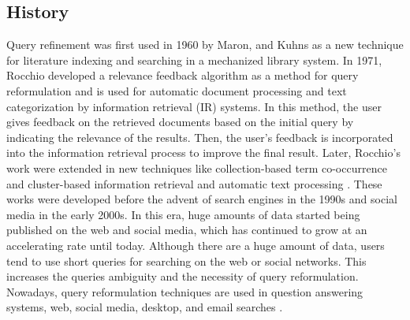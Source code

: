 \documentclass[sigconf]{acmart}
\begin{document}
\subsection{History}
Query refinement was first used in 1960 by Maron, and Kuhns \cite{maron1960relevance} as a new technique for literature indexing and searching in a mechanized library system. In 1971, Rocchio \cite{rocchio1971relevance} developed a relevance feedback algorithm as a method for query reformulation and is used for automatic document processing and text categorization by information retrieval (IR) systems. In this method, the user gives feedback on the retrieved documents based on the initial query by indicating the relevance of the results. Then, the user’s feedback is incorporated into the information retrieval process to improve the final result. Later, Rocchio's work were extended in new techniques like collection-based term co-occurrence and cluster-based information retrieval \cite{jones1971automatic,jardine1971use} and automatic text processing \cite{salton1989automatic}. These works were developed before the advent of search engines in the 1990s and social media in the early 2000s. In this era, huge amounts of data started being published on the web and social media, which has continued to grow at an accelerating rate until today. Although there are a huge amount of data, users tend to use short queries for searching on the web or social networks. This increases the queries ambiguity and the necessity of query reformulation. Nowadays, query reformulation techniques are used in question answering systems, web, social media, desktop, and email searches \cite{pal2015exploring}.
\end{document}
